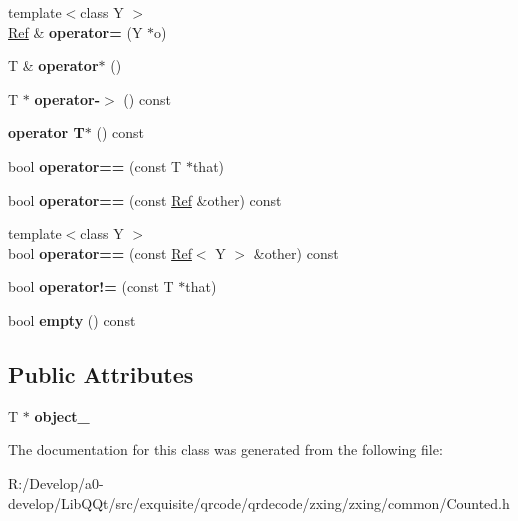 \begin{DoxyCompactItemize}
\item 
\mbox{\label{classzxing_1_1_ref_a97e497faeb13e6be86df23b41f876573}} 
{\footnotesize template$<$class Y $>$ }\\\mbox{\hyperlink{classzxing_1_1_ref}{Ref}} \& {\bfseries operator=} (Y $\ast$o)
\item 
\mbox{\label{classzxing_1_1_ref_a4ebcedfd6076e1db86c5614ac57280f4}} 
T \& {\bfseries operator$\ast$} ()
\item 
\mbox{\label{classzxing_1_1_ref_ae60e7d0bcfeee4100a48956a6f31774a}} 
T $\ast$ {\bfseries operator-\/$>$} () const
\item 
\mbox{\label{classzxing_1_1_ref_a39da0569479ece3ed2c1b213b61968bf}} 
{\bfseries operator T$\ast$} () const
\item 
\mbox{\label{classzxing_1_1_ref_aa3ed4dc6ecc2146b9af66cca4250748c}} 
bool {\bfseries operator==} (const T $\ast$that)
\item 
\mbox{\label{classzxing_1_1_ref_ae7b75fb3d7f6c39ca784cc3f1f132724}} 
bool {\bfseries operator==} (const \mbox{\hyperlink{classzxing_1_1_ref}{Ref}} \&other) const
\item 
\mbox{\label{classzxing_1_1_ref_a21e96ac1550652c2f34cbd48c2fc0c6a}} 
{\footnotesize template$<$class Y $>$ }\\bool {\bfseries operator==} (const \mbox{\hyperlink{classzxing_1_1_ref}{Ref}}$<$ Y $>$ \&other) const
\item 
\mbox{\label{classzxing_1_1_ref_abddb7232f5b372b771feafaaba986e16}} 
bool {\bfseries operator!=} (const T $\ast$that)
\item 
\mbox{\label{classzxing_1_1_ref_ac62fd475bce250d833d086169926acb4}} 
bool {\bfseries empty} () const
\end{DoxyCompactItemize}
\subsection*{Public Attributes}
\begin{DoxyCompactItemize}
\item 
\mbox{\label{classzxing_1_1_ref_abf19a553868ae69909d27a033b62c7b7}} 
T $\ast$ {\bfseries object\+\_\+}
\end{DoxyCompactItemize}


The documentation for this class was generated from the following file\+:\begin{DoxyCompactItemize}
\item 
R\+:/\+Develop/a0-\/develop/\+Lib\+Q\+Qt/src/exquisite/qrcode/qrdecode/zxing/zxing/common/Counted.\+h\end{DoxyCompactItemize}
